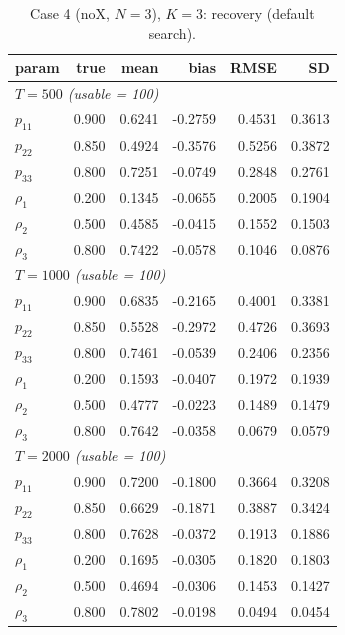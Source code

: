 \documentclass[11pt]{article}
\begin{document}
\begin{table}[!htbp]\centering\small
\caption{Case 4 (noX, $N=3$), $K = 3$: recovery (default search).}\label{tab:c4k3}
\begin{tabular}{lrrrrr}
\toprule
param & true & mean & bias & RMSE & SD\\
\midrule\multicolumn{6}{l}{\emph{$T = 500$ (usable = 100)}}\\
$p_{11}$ & 0.900 & 0.6241 & -0.2759 & 0.4531 & 0.3613\\
$p_{22}$ & 0.850 & 0.4924 & -0.3576 & 0.5256 & 0.3872\\
$p_{33}$ & 0.800 & 0.7251 & -0.0749 & 0.2848 & 0.2761\\
$\rho_1$ & 0.200 & 0.1345 & -0.0655 & 0.2005 & 0.1904\\
$\rho_2$ & 0.500 & 0.4585 & -0.0415 & 0.1552 & 0.1503\\
$\rho_3$ & 0.800 & 0.7422 & -0.0578 & 0.1046 & 0.0876\\
\midrule\multicolumn{6}{l}{\emph{$T = 1000$ (usable = 100)}}\\
$p_{11}$ & 0.900 & 0.6835 & -0.2165 & 0.4001 & 0.3381\\
$p_{22}$ & 0.850 & 0.5528 & -0.2972 & 0.4726 & 0.3693\\
$p_{33}$ & 0.800 & 0.7461 & -0.0539 & 0.2406 & 0.2356\\
$\rho_1$ & 0.200 & 0.1593 & -0.0407 & 0.1972 & 0.1939\\
$\rho_2$ & 0.500 & 0.4777 & -0.0223 & 0.1489 & 0.1479\\
$\rho_3$ & 0.800 & 0.7642 & -0.0358 & 0.0679 & 0.0579\\
\midrule\multicolumn{6}{l}{\emph{$T = 2000$ (usable = 100)}}\\
$p_{11}$ & 0.900 & 0.7200 & -0.1800 & 0.3664 & 0.3208\\
$p_{22}$ & 0.850 & 0.6629 & -0.1871 & 0.3887 & 0.3424\\
$p_{33}$ & 0.800 & 0.7628 & -0.0372 & 0.1913 & 0.1886\\
$\rho_1$ & 0.200 & 0.1695 & -0.0305 & 0.1820 & 0.1803\\
$\rho_2$ & 0.500 & 0.4694 & -0.0306 & 0.1453 & 0.1427\\
$\rho_3$ & 0.800 & 0.7802 & -0.0198 & 0.0494 & 0.0454\\
\bottomrule
\end{tabular}
\end{table}
\end{document}

